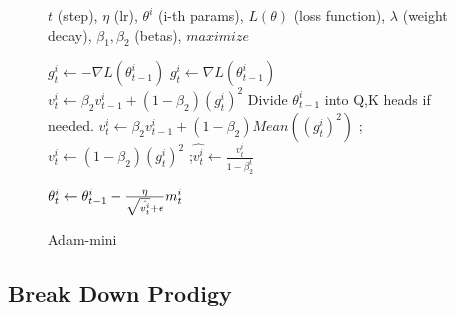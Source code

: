 \begin{figure}[t]
\begin{algorithm}[H]
    \caption{Adam-mini}\label{algorithm:adam_mini}
    \begin{algorithmic}[1]
        \Require $t$ (step), $\eta$ (lr), $\theta^i$ (i-th params), $L(\theta)$ (loss function), $\lambda$ (weight decay), $\beta_1, \beta_2$ (betas),  $maximize$ 
        
        \Repeat
                \State $g^i_t \gets -\nabla L(\theta^i_{t-1})$
            \Else
                \State $g^i_t \gets \nabla L(\theta^i_{t-1})$
            \EndIf
            \State
            \State {}
                    \State $v^i_t \gets \beta_2 v^i_{t-1} + (1-\beta_2) (g^i_t)^2 $
                \Else
                    \State Divide $\theta^i_{t-1}$ into Q,K heads if needed.
                    \State $v^i_t \gets \beta_2 v^i_{t-1} + (1-\beta_2) Mean( (g^i_t)^2 ) $
                \EndIf
            \Else
                \State {}; $v^i_t \gets (1-\beta_2) (g^i_t)^2 $
            \EndIf
            ;{$\hat{v^i_t} \gets \frac{v^i_t}{1-\beta_2^t}$}
            \State
            
            \State {}
            \State
            \State $\theta^i_t \gets \theta^i_{t-1} - \text{$ \frac{\eta}{\sqrt{\hat{v^i_t}} + \epsilon}m^i_t $} $

        \EndFor
    \end{algorithmic}
\end{algorithm}
\end{figure}


\subsection{Break Down Prodigy}

